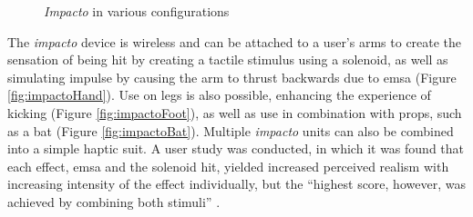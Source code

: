 \begin{figure}[h]
    \centering
    \hfill
    \hfill
    \caption{\textit{Impacto} in various configurations \autocite{impacto}}
    \label{fig:impactoConfigs}
\end{figure}

The \textit{impacto} device is wireless and can be attached to a user's arms to create the sensation of being hit by creating a tactile stimulus using a solenoid, as well as simulating impulse by causing the arm to thrust backwards due to \gls{emsa} (Figure \autoref{fig:impactoHand}). Use on legs is also possible, enhancing the experience of kicking (Figure \autoref{fig:impactoFoot}), as well as use in combination with props, such as a bat (Figure \autoref{fig:impactoBat}). Multiple \textit{impacto} units can also be combined into a simple haptic suit.
\newline
A user study was conducted, in which it was found that each effect, \gls{emsa} and the solenoid hit, yielded increased perceived realism with increasing intensity of the effect individually, but the \enquote{highest
score, however, was achieved by combining both stimuli} \autocite[p. ~8]{impacto}.


